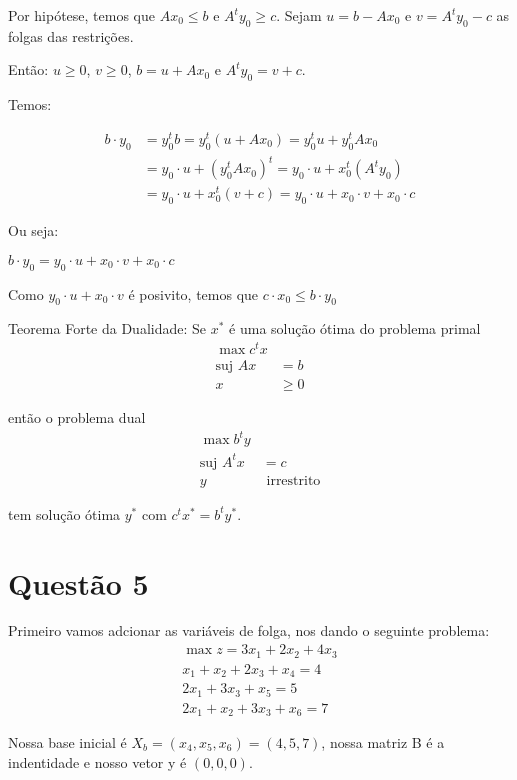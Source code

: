 \documentclass[11pt]{article}
\begin{document}
Por hipótese, temos que \(Ax_0 \leq b\) e \(A^ty_0 \geq c\). Sejam \(u = b - Ax_0\) e \(v = A^ty_0 - c\) as folgas das restrições.

Então: \(u \geq 0\), \(v \geq 0\), \(b = u + Ax_0\) e \(A^ty_0 = v + c\).

Temos:

\begin{align*}
   b\cdot y_{0} &= y_{0}^{t}b = y_{0}^{t}(u+Ax_{0}) = y_{0}^{t}u+y_{0}^{t}Ax_{0}\\
   &= y_{0}\cdot u + {(y_{0}^{t}Ax_{0})}^{t} = y_{0}\cdot u + x_{0}^{t}(A^{t}y_{0}) \\
   &= y_{0}\cdot u + x_{0}^{t}(v+c) = y_{0}\cdot u + x_{0}\cdot v + x_{0}\cdot c
 \end{align*}

Ou seja:

$b\cdot y_{0} = y_{0}\cdot u + x_{0}\cdot v + x_{0}\cdot c$

Como \(y_0\cdot u + x_0\cdot v\) é posivito, temos que \(c\cdot x_0 \leq b\cdot y_0\)

Teorema Forte da Dualidade: Se \(x^*\) é uma solução ótima do problema primal
\begin{align*}
  \max c^{t}x\\
  \text{suj }Ax &= b\\
  x &\geq 0
\end{align*}

então o problema dual
\begin{align*}
  \max b^{t}y\\
  \text{suj }A^{t}x &= c\\
  y &\text{ irrestrito}
\end{align*}

tem solução ótima \(y^*\) com \(c^tx^* = b^ty^*\).
\section{Questão 5}
\label{sec:orge8662c0}
Primeiro vamos adcionar as variáveis de folga, nos dando o seguinte problema:
\begin{align*}
  \max z = 3x_{1} + 2x_{2} + 4x_{3}\\
  x_{1} + x_{2} + 2x_{3} + x_{4} = 4\\
  2x_{1} + 3x_{3} + x_{5} = 5\\
  2x_{1} + x_{2} + 3x_{3} + x_{6} = 7
\end{align*}

Nossa base inicial é \(X_b = (x_4, x_5, x_6) = (4, 5, 7)\), nossa matriz B é a indentidade e nosso vetor y é \((0, 0, 0)\).
\end{document}
